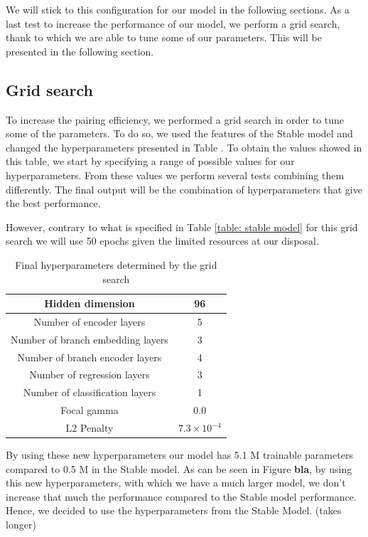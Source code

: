 We will stick to this configuration for our model in the following sections. As a last test to increase the performance of our model, we perform a grid search, thank to which we are able to tune some of our parameters. This will be presented in the following section.


\subsection{Grid search}
To increase the pairing efficiency, we performed a grid search in order to tune some of the parameters. To do so, we used the features of the Stable model and changed the hyperparameters presented in Table . To obtain the values showed in this table, we start by specifying a range of possible values for our hyperparameters. From these values we perform several tests combining them differently. The final output will be the combination of hyperparameters that give the best performance.

However, contrary to what is specified in Table \ref{table: stable model} for this grid search we will use 50 epochs given the limited resources at our disposal.

\begin{table}[hbt]
\centering
\begin{tabular}{|c|c|}
 \hline
 Hidden dimension  &  96  \\
 \hline
Number of encoder layers & 5 \\
 \hline
 Number of branch embedding layers &  3\\
 \hline
  Number of branch encoder layers & 4\\
 \hline
 Number of regression layers & 3 \\
 \hline
 Number of classification layers & 1 \\
 \hline
 Focal gamma & 0.0 \\
 \hline
 L2 Penalty & $7.3\times 10^{-4}$ \\
 \hline
\end{tabular}
\caption{Final hyperparameters determined by the grid search}
\label{table: gris search}
\end{table}

By using these new hyperparameters our model has 5.1 M trainable parameters compared to 0.5 M in the Stable model. As can be seen in Figure \textbf{bla}, by using this new hyperparameters, with which we have a much larger model, we don't increase that much the performance compared to the Stable model performance. Hence, we decided to use the hyperparameters from the Stable Model. (takes longer)


